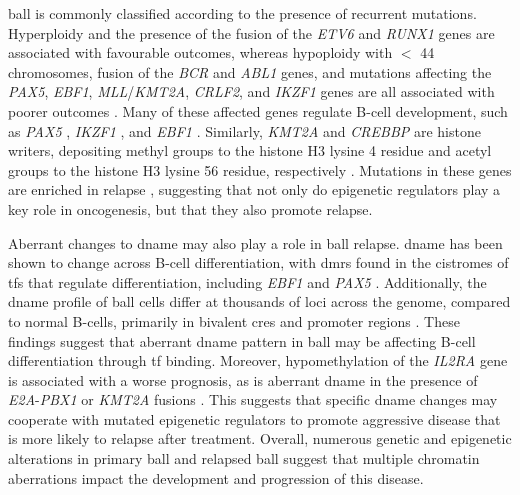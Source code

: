 \Gls{ball} is commonly classified according to the presence of recurrent mutations.
Hyperploidy and the presence of the fusion of the \emph{ETV6} and \emph{RUNX1} genes are associated with favourable outcomes, whereas hypoploidy with $<$ 44 chromosomes, fusion of the \emph{BCR} and \emph{ABL1} genes, and mutations affecting the \emph{PAX5}, \emph{EBF1}, \emph{MLL}/\emph{KMT2A}, \emph{CRLF2}, and \emph{IKZF1} genes are all associated with poorer outcomes \cite{inabaAcuteLymphoblasticLeukaemia2013,hungerAcuteLymphoblasticLeukemia2015}.
Many of these affected genes regulate B-cell development, such as \emph{PAX5} \cite{liuPax5LossImposes2014,dangPAX5TumorSuppressor2015,mullighanGenomewideAnalysisGenetic2007}, \emph{IKZF1} \cite{mullighanGenomewideAnalysisGenetic2007}, and \emph{EBF1} \cite{bollerDefiningCellChromatin2018,nuttTranscriptionalRegulationCell2007}.
Similarly, \emph{KMT2A} and \emph{CREBBP} are histone writers, depositing methyl groups to the histone H3 lysine 4 residue and acetyl groups to the histone H3 lysine 56 residue, respectively \cite{slanyMLLFusionProteins2020,krivtsovMLLTranslocationsHistone2007,raoHijackedCancerKMT22015,parkPHD3DomainMLL2010,liStructuralBasisActivity2016,dasBindingHistoneChaperone2014}.
Mutations in these genes are enriched in relapse \cite{hungerAcuteLymphoblasticLeukemia2015,mullighanGenomicAnalysisClonal2008}, suggesting that not only do epigenetic regulators play a key role in oncogenesis, but that they also promote relapse.

Aberrant changes to \gls{dname} may also play a role in \gls{ball} relapse.
\Gls{dname} has been shown to change across B-cell differentiation, with \glspl{dmr} found in the cistromes of \glspl{tf} that regulate differentiation, including \emph{EBF1} and \emph{PAX5} \cite{leeGlobalDNAMethylation2012}.
Additionally, the \gls{dname} profile of \gls{ball} cells differ at thousands of loci across the genome, compared to normal B-cells, primarily in bivalent \glspl{cre} and promoter regions \cite{leeEpigeneticRemodelingBcell2015,nordlundGenomewideSignaturesDifferential2013}.
These findings suggest that aberrant \gls{dname} pattern in \gls{ball} may be affecting B-cell differentiation through \gls{tf} binding.
Moreover, hypomethylation of the \emph{IL2RA} gene is associated with a worse prognosis, as is aberrant \gls{dname} in the presence of \emph{E2A}-\emph{PBX1} or \emph{KMT2A} fusions \cite{gengIntegrativeEpigenomicAnalysis2012}.
This suggests that specific \gls{dname} changes may cooperate with mutated epigenetic regulators to promote aggressive disease that is more likely to relapse after treatment.
Overall, numerous genetic and epigenetic alterations in primary \gls{ball} and relapsed \gls{ball} suggest that multiple chromatin aberrations impact the development and progression of this disease.

